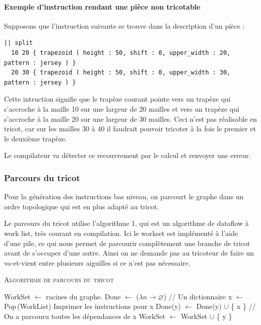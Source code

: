 \documentclass{article}
\begin{document}
\paragraph{Exemple d'instruction rendant une pièce non tricotable\\} 

 Supposons que l'instruction suivante se trouve dans la description d'un pièce :
 
	\begin{lstlisting}
|| split
  10 20 { trapezoid ( height : 50, shift : 0, upper_width : 20, pattern : jersey ) }
  20 30 { trapezoid ( height : 50, shift : 0, upper_width : 30, pattern : jersey ) }
	\end{lstlisting}

 Cette intruction signifie que le trapèze courant pointe vers un trapèze qui s'accroche à la maille 10 sur une largeur de 20 mailles et vers un trapèze qui s'accroche à la maille 20 sur une largeur de 30 mailles. Ceci n'est pas réalisable en tricot, car sur les mailles 30 à 40 il faudrait pouvoir tricoter à la fois le premier et le deuxième trapèze.
 
 Le compilateur va détecter ce recouvrement par le calcul et renvoyer une erreur.



\subsubsection{Parcours du tricot}

Pour la génération des instructions bas niveau, on parcourt le graphe 
dans un ordre topologique qui est en plus adapté au tricot.

Le parcours du tricot utilise l'algorithme 1, qui est un algorithme de
dataflow à work list, très courant en compilation. Ici le workset est
implémenté à l'aide d'une pile, ce qui nous permet de parcourir
complètement une branche de tricot avant de s'occuper d'une
autre. Ainsi on ne demande pas au tricoteur de faire un va-et-vient
entre plusieurs aiguilles si ce n'est pas nécessaire.

\begin{algorithm}\label{algo}
\caption{\textsc{Algorithme de parcours du tricot}}
\begin{algorithmic}[1]
\State WorkSet $\leftarrow$ racines du graphe.
\State Done $\leftarrow$ ($\lambda n \to \varnothing$) // Un dictionnaire
  \State x $\leftarrow$ Pop\,(WorkList)
  \State Imprimer les instructions pour x
    \State Done(y) $\leftarrow$ Done(y) $\cup$ \{ x \}
     // On a parcouru toutes les dépendances de x
      \State WorkSet $\leftarrow$ WorkSet $\cup$ \{ y \}
    \EndIf
  \EndFor
\EndWhile
\end{algorithmic}
\end{algorithm}
\end{document}
